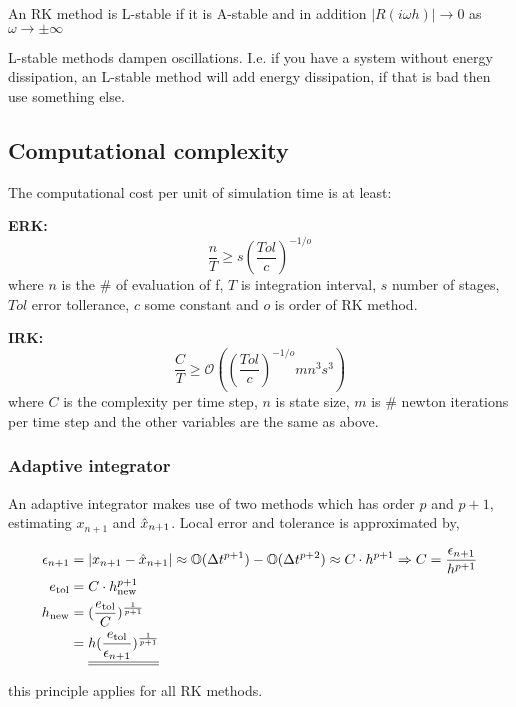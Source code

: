 An RK method is L-stable if it is A-stable and in addition $|R(i\omega h)| \rightarrow 0$ as $\omega \rightarrow \pm \infty$

L-stable methods dampen oscillations. I.e. if you have a system without energy dissipation, an L-stable method will add energy dissipation, if that is bad then use something else.

\subsection{Computational complexity}
The computational cost per unit of simulation time is at least:

\textbf{ERK:} 
$$
\frac{n}{T} \geq s \left(\frac{Tol}{c}\right)^{-1/o}
$$
where $n$ is the \# of evaluation of f, $T$ is integration interval, $s$ number of stages, $Tol$ error tollerance, $c$ some constant and $o$ is order of RK method. 

\textbf{IRK:} 
$$
\frac{C}{T}\geq \mathcal{O}(\left(\frac{Tol}{c}\right)^{-1/o} m n^3 s^3)
$$
where $C$ is the complexity per time step, $n$ is state size, $m$ is \# newton iterations per time step and the other variables are the same as above.  

\subsubsection{Adaptive integrator}

An adaptive integrator makes use of two methods which has order $p$ and $p+1$, estimating $x_{n+1}$ and $\Hat{x}_{n+1}$. Local error and tolerance is approximated by,

\begin{align}
    \begin{split}
        \epsilon_{n+1} &= |x_{n+1} - \Hat{x}_{n+1}| \approx \mathbb{O}(\Delta t^{p+1}) - \mathbb{O}(\Delta t^{p+2}) \approx C \cdot h^{p+1} \Rightarrow C = \frac{\epsilon_{n+1}}{h^{p+1}}
        \\
        e_\text{tol} &= C \cdot h_\text{new}^{p+1}
        \\
        h_\text{new} &= (\frac{e_\text{tol}}{C})^{\frac{1}{p+1}}
        \\
        &= \underline{\underline{h(\frac{e_\text{tol}}{\epsilon_{n+1}})^{\frac{1}{p+1}}}}
    \end{split}
\end{align}

this principle applies for all RK methods.


